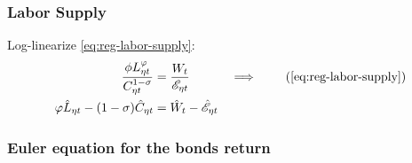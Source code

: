 \documentclass[
thesis.tex
]{subfiles}
\begin{document}
\begin{comment}
	
Isolate $\hat{\mathscr{E}}_{\eta t}$ in \ref{eq:reg-ll-regional-consumption-and-prices} and substitute in \ref{eq:reg-ll-total-expense-level}:
\begin{align}
	\hat{C}_{\eta 1 t} &= \hat{\mathscr{E}}_{\eta t} - \hat{P}_{\eta t} \iff \hat{\mathscr{E}}_{\eta t} = \hat{C}_{\eta 1 t} + \hat{P}_{\eta t} \tag{\ref{eq:reg-ll-regional-consumption-and-prices}} \\
	\hat{C}_{\eta 1 t} + \hat{P}_{\eta t} &= \hat{C}_{\eta t} + \omega_{\eta 1} \hat{P}_{\eta t} + (1 -\omega_{\eta 1}) \hat{P}_{\nu t} \implies \nonumber \\
	\hat{C}_{\eta t} - \hat{C}_{\eta 1 t} &= (1 -\omega_{\eta 1}) (\hat{P}_{\eta t} - \hat{P}_{\nu t}) \label{eq:reg-ll-total-expense-level-2}
\end{align}

Equation \ref{eq:reg-ll-total-expense-level-2} shows that the distance between the regional consumption and the good $\eta$ consumption is proportional to the distance between the variations of both regional price levels.	
	
\end{comment}




\subsubsection*{Labor Supply}

Log-linearize \ref{eq:reg-labor-supply}:
\begin{alignat}{2}
	\frac{\phi L_{\eta t}^{\varphi}}{C_{\eta t}^{1-\sigma}} &= \frac{W_t}{\te} &\implies \tag{\ref{eq:reg-labor-supply}} \\
	\varphi \hat{L}_{\eta t} - (1 -\sigma) \hat{C}_{\eta t} &= \hat{W}_t - \hat{ \mathscr{E} }_{\eta t} & \label{eq:reg-ll-labor-supply}
\end{alignat}


\subsubsection*{Euler equation for the bonds return}
\end{document}

